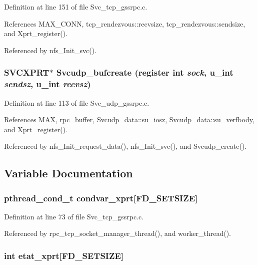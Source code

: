 Definition at line 151 of file Svc\_\-tcp\_\-gssrpc.c.

References MAX\_\-CONN, tcp\_\-rendezvous::recvsize, tcp\_\-rendezvous::sendsize, and Xprt\_\-register().

Referenced by nfs\_\-Init\_\-svc().
\subsubsection{\setlength{\rightskip}{0pt plus 5cm}SVCXPRT$\ast$ Svcudp\_\-bufcreate (register int {\em sock}, u\_\-int {\em sendsz}, u\_\-int {\em recvsz})}\label{nfs__rpc__dispatcher__thread_8c_a16}




Definition at line 113 of file Svc\_\-udp\_\-gssrpc.c.

References MAX, rpc\_\-buffer, Svcudp\_\-data::su\_\-iosz, Svcudp\_\-data::su\_\-verfbody, and Xprt\_\-register().

Referenced by nfs\_\-Init\_\-request\_\-data(), nfs\_\-Init\_\-svc(), and Svcudp\_\-create().

\subsection{Variable Documentation}
\subsubsection{\setlength{\rightskip}{0pt plus 5cm}pthread\_\-cond\_\-t {\bf condvar\_\-xprt}[FD\_\-SETSIZE]}\label{nfs__rpc__dispatcher__thread_8c_a9}




Definition at line 73 of file Svc\_\-tcp\_\-gssrpc.c.

Referenced by rpc\_\-tcp\_\-socket\_\-manager\_\-thread(), and worker\_\-thread().
\subsubsection{\setlength{\rightskip}{0pt plus 5cm}int {\bf etat\_\-xprt}[FD\_\-SETSIZE]}\label{nfs__rpc__dispatcher__thread_8c_a10}




